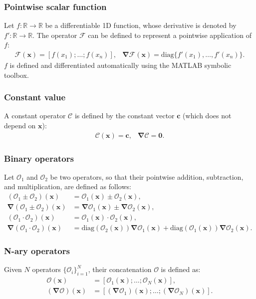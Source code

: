 \documentclass[MSc,beforeExam]{iitcsthesis}
\newcommand{\diag}{\ensuremath{\mathrm{diag}}}
\newcommand{\RR}{\ensuremath{\mathbb{R}}}
\newcommand\bnabla{\boldsymbol{\nabla}}
\newcommand\bx{\boldsymbol{x}}
\newcommand\bc{\boldsymbol{c}}
\newcommand\bzero{\boldsymbol{0}}
\newcommand\cF{\mathcal{F}}
\newcommand\cO{\mathcal{O}}
\begin{document}
\subsubsection{Pointwise scalar function}
Let $f: \RR \rightarrow \RR$ be a differentiable 1D function, whose derivative is
denoted by $f': \RR \rightarrow \RR$. The operator $\cF$ can be defined to
represent a pointwise application of $f$:
\begin{equation}\begin{array}{cc}
\cF(\bx) = [f(x_1); \ldots; f(x_n)], &
\bnabla\cF(\bx) = \diag\{f'(x_1), \ldots, f'(x_n)\}.
\end{array}\end{equation}
$f$ is defined and differentiated automatically using the MATLAB symbolic toolbox.

\subsubsection{Constant value}
A constant operator $\mathcal{C}$ is defined by the constant vector $\bc$ 
(which does not depend on $\bx$):
\begin{equation}\begin{array}{cc}
\mathcal{C}(\bx) = \bc, &
\bnabla\mathcal{C} = \bzero.
\end{array}\end{equation}

\subsubsection{Binary operators}
Let $\cO_1$ and $\cO_2$ be two operators, so that their pointwise addition, subtraction,
and multiplication, are defined as follows:
\begin{align}
(\cO_1 \pm \cO_2)(\bx) &= \cO_1(\bx) \pm \cO_2(\bx), \\
\nonumber
\bnabla (\cO_1 \pm \cO_2)(\bx) &= \bnabla\cO_1(\bx) \pm \bnabla\cO_2(\bx), \\
(\cO_1 \cdot \cO_2)(\bx) &= \cO_1(\bx) \cdot \cO_2(\bx), \\
\nonumber
\bnabla (\cO_1 \cdot \cO_2)(\bx) &= \diag(\cO_2(\bx)) \bnabla\cO_1(\bx) 
                                  + \diag(\cO_1(\bx)) \bnabla\cO_2(\bx).
\end{align}
\subsubsection{N-ary operators}
Given $N$ operators $\{\cO_i\}_{i=1}^N$, their concatenation $\cO$ is defined as:
\begin{align}
\cO(\bx) &= [\cO_1(\bx); \ldots; \cO_N(\bx)], \\
\nonumber
(\bnabla\cO)(\bx) &= [(\bnabla\cO_1)(\bx); \ldots; (\bnabla\cO_N)(\bx)].
\end{align}
\end{document}
